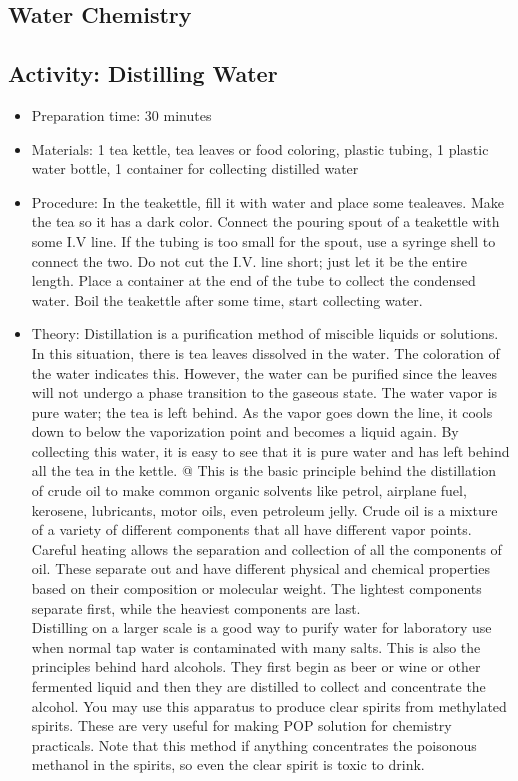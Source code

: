 \begin{itemize}
{\begin{itemize}
\begin{itemize}
{\section{Water Chemistry}

\subsection{Activity: Distilling Water}
\begin{itemize}
\item{Preparation time: 30 minutes}
\item{Materials: 1 tea kettle, tea leaves or food coloring, plastic tubing, 1 plastic water bottle, 1 container for collecting distilled water}
\item{Procedure: In the teakettle, fill it with water and place some tealeaves. Make the tea so it has a dark color. Connect the pouring spout of a teakettle with some I.V line. If the tubing is too small for the spout, use a syringe shell to connect the two. Do not cut the I.V. line short; just let it be the entire length. Place a container at the end of the tube to collect the condensed water. Boil the teakettle after some time, start collecting water. }
\item{Theory: Distillation is a purification method of miscible liquids or solutions. In this situation, there is tea leaves dissolved in the water. The coloration of the water indicates this. However, the water can be purified since the leaves will not undergo a phase transition to the gaseous state. The water vapor is pure water; the tea is left behind. As the vapor goes down the line, it cools down to below the vaporization point and becomes a liquid again. By collecting this water, it is easy to see that it is pure water and has left behind all the tea in the kettle. @	This is the basic principle behind the distillation of crude oil to make common organic solvents like petrol, airplane fuel, kerosene, lubricants, motor oils, even petroleum jelly. Crude oil is a mixture of a variety of different components that all have different vapor points. Careful heating allows the separation and collection of all the components of oil. These separate out and have different physical and chemical properties based on their composition or molecular weight. The lightest components separate first, while the heaviest components are last.\\
Distilling on a larger scale is a good way to purify water for laboratory use when normal tap water is contaminated with many salts. This is also the principles behind hard alcohols. They first begin as beer or wine or other fermented liquid and then they are distilled to collect and concentrate the alcohol. You may use this apparatus to produce clear spirits from methylated spirits. These are very useful for making POP solution for chemistry practicals. Note that this method if anything concentrates the poisonous methanol in the spirits, so even the clear spirit is toxic to drink.}
\end{itemize}

}
\end{itemize}
\end{itemize}}
\end{itemize}
